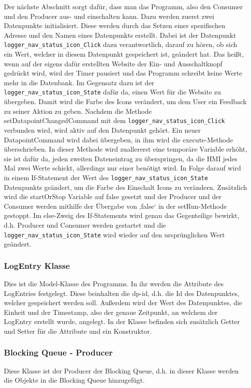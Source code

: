 Der nächste Abschnitt sorgt dafür, dass man das Programm, also den Consumer und den Producer aus- und einschalten kann. Dazu werden zuerst zwei Datenpunkte initialisiert. Diese werden durch das Setzen einer spezifischen Adresse und den Namen eines Datenpunkts erstellt. Dabei ist der Datenpunkt \texttt{logger\_nav\_status\_icon\_Click} dazu verantwortlich, darauf zu hören, ob sich ein Wert, welcher in diesem Datenpunkt gespeichert ist, geändert hat. Das heißt, wenn auf der eigens dafür erstellten Website der Ein- und Ausschaltknopf gedrückt wird, wird der Timer pausiert und das Programm schreibt keine Werte mehr in die Datenbank. Im Gegensatz dazu ist der \texttt{logger\_nav\_status\_icon\_State} dafür da, einen Wert für die Website zu übergeben. Damit wird die Farbe des Icons verändert, um dem User ein Feedback zu seiner Aktion zu geben.
Nachdem die Methode setDatapointChangedCommand mit dem \texttt{logger\_nav\_status\_icon\_Click} verbunden wird, wird aktiv auf den Datenpunkt gehört. Ein neuer DatapointCommand wird dabei übergeben, in ihm wird die execute-Methode überschrieben. In dieser Methode wird zuallererst eine temporäre Variable erhöht, sie ist dafür da, jeden zweiten Dateneintrag zu überspringen, da die HMI jedes Mal zwei Werte schickt, allerdings nur einer benötigt wird. In Folge darauf wird in einem If-Statement der Wert des \texttt{logger\_nav\_status\_icon\_State} Datenpunkts geändert, um die Farbe des Einschalt Icons zu verändern. Zusätzlich wird die startOrStop Variable auf false gesetzt und der Producer und der Consumer werden mithilfe der Übergabe von ‚false‘ in der setRun-Methode gestoppt. Im else-Zweig des If-Statements wird genau das Gegenteilige bewirkt, d.h. Producer und Consumer werden gestartet und die \texttt{logger\_nav\_status\_icon\_State} wird wieder auf den ursprünglichen Wert geändert.
 
\subsubsection{LogEntry Klasse}
Dies ist die Model-Klasse des Programms. In ihr werden die Attribute des LogEntries festgelegt. Diese beinhalten die dp-id, d.h. die Id des Datenpunktes, welcher gespeichert werden soll. Außerdem wird der Wert des Datenpunktes, die Einheit und der Timestamp, also der genaue Zeitpunkt, an welchem der LogEntry erstellt wurde, angelegt. In der Klasse befinden sich zusätzlich Getter und Setter für die Attribute und ein Konstruktor.
 
\subsubsection{Blocking Queue - Producer }
Diese Klasse ist der Producer der Blocking Queue, d.h. in dieser Klasse werden die Objekte in die Blocking Queue hinzugefügt.
 
